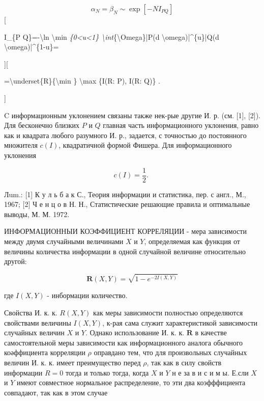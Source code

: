 \documentclass[10pt]{article}
\begin{document}
\[

\alpha_{N}=\beta_{N} \sim \exp \left[-N I_{P Q}\right]

\][



I\_\{P Q\}=-\textbackslash ln \textbackslash min \textit{\{0<u<1\} \textbackslash int}\{\textbackslash Omega\}|P(d \textbackslash omega)|\^{}\{u\}|Q(d \textbackslash omega)|\^{}\{1-u\}=



][



=\textbackslash underset\{R\}\{\textbackslash min \} \textbackslash max \{I(R: P), I(R: Q)\} .

]



C информационным уклонением связаны также нек-рые другие И. р. (см. [1], [2]). Для бесконечно близких $P$ и $Q$ главная часть информационного уклонения, равно как и квадрата любого разумного И. р., задается, с точностью до постоянного множителя $c(I)$, квадратичной формой Фишера. Для информационного уклонения



\[

c(I)=\frac{1}{2} \text {. }

\]



Лum.: [1] К у л ь б а к С., Теория информации и статистика, пер. с англ., М., 1967; [2] Ч е н ц о в Н. Н., Статистические решающие правила и оптимальные выводы, М. М. 1972.



ИНФОРМАЦИОННЫИ КОЭФФИЦИЕНТ КОРРЕЛЯЦИИ - мера зависимости между двумя случайными величинами $X$ и $Y$, определяемая как функция от величины количества информации в одной случайной величине относительно другой:



\[

\boldsymbol{R}(X, Y)=\sqrt{1-e^{-2 I(X, Y)}}

\]



где $I(X, Y)$ - инбормации количество.



Свойства И. к. к. $R(X, Y)$ как меры зависимости полностью определяются свойствами величины $I(X, Y)$, к-рая сама служит характеристикой зависимости случайных величин $X$ и $Y$. Однако использование И. к. к. $\boldsymbol{R}$ в качестве самостоятельной меры зависимости как информационного аналога обычного коәффициента корреляции $\rho$ оправдано тем, что для произвольных случайных величин И. к. к. имеет преимущество перед $\rho$, так как в силу свойств информации $R=0$ тогда и только тогда, когда $X$ и $Y$ н е за в и с и м ы. Е.сли $X$ и $Y$ имеют совместное нормальное распределение, то эти два коэфффициента совпадают, так как в этом случае
\end{document}
